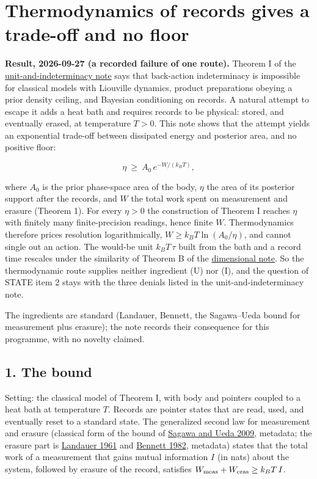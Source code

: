 \documentclass[11pt,a4paper]{article}
\begin{document}
\hypertarget{thermodynamics-of-records-gives-a-trade-off-and-no-floor}{%
\section{Thermodynamics of records gives a trade-off and no
floor}\label{thermodynamics-of-records-gives-a-trade-off-and-no-floor}}

\textbf{Result, 2026-09-27 (a recorded failure of one route).} Theorem I
of the \href{necessity-unit-and-indeterminacy.md}{unit-and-indeterminacy
note} says that back-action indeterminacy is impossible for classical
models with Liouville dynamics, product preparations obeying a prior
density ceiling, and Bayesian conditioning on records. A natural attempt
to escape it adds a heat bath and requires records to be physical:
stored, and eventually erased, at temperature \(T>0\). This note shows
that the attempt yields an exponential trade-off between dissipated
energy and posterior area, and no positive floor:

\[\eta\ \ge\ A_0\,e^{-W/(k_BT)},\]

where \(A_0\) is the prior phase-space area of the body, \(\eta\) the
area of its posterior support after the records, and \(W\) the total
work spent on measurement and erasure (Theorem 1). For every \(\eta>0\)
the construction of Theorem I reaches \(\eta\) with finitely many
finite-precision readings, hence finite \(W\). Thermodynamics therefore
prices resolution logarithmically, \(W\ge k_BT\ln(A_0/\eta)\), and
cannot single out an action. The would-be unit \(k_BT\,\tau\) built from
the bath and a record time rescales under the similarity of Theorem B of
the \href{action-unit-dimensional-selection.md}{dimensional note}. So
the thermodynamic route supplies neither ingredient (U) nor (I), and the
question of STATE item 2 stays with the three denials listed in the
unit-and-indeterminacy note.

The ingredients are standard (Landauer, Bennett, the Sagawa--Ueda bound
for measurement plus erasure); the note records their consequence for
this programme, with no novelty claimed.

\hypertarget{the-bound}{%
\subsection{1. The bound}\label{the-bound}}

Setting: the classical model of Theorem I, with body and pointers
coupled to a heat bath at temperature \(T\). Records are pointer states
that are read, used, and eventually reset to a standard state. The
generalized second law for measurement and erasure (classical form of
the bound of
\href{https://doi.org/10.1103/PhysRevLett.102.250602}{Sagawa and Ueda
2009}, metadata; the erasure part is
\href{https://doi.org/10.1147/rd.53.0183}{Landauer 1961} and
\href{https://doi.org/10.1007/BF02084158}{Bennett 1982}, metadata)
states that the total work of a measurement that gains mutual
information \(I\) (in nats) about the system, followed by erasure of the
record, satisfies \(W_{\rm meas}+W_{\rm eras}\ge k_BT\,I\).
\end{document}
